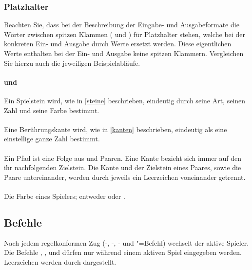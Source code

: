 \documentclass[ngerman, gray]{sdqassignment}
\begin{document}
\subsubsection{Platzhalter}
Beachten Sie, dass bei der Beschreibung der Eingabe- und Ausgabeformate die Wörter zwischen spitzen Klammen (\txt{<} und \txt{>}) für Platzhalter stehen, welche bei der konkreten Ein- und Ausgabe durch Werte ersetzt werden. Diese eigentlichen Werte enthalten bei der Ein- und Ausgabe keine spitzen Klammern. Vergleichen Sie hierzu auch die jeweiligen Beispielabläufe.

\paragraph{ und } Ein Spielstein wird, wie in \cref{steine} beschrieben, eindeutig durch seine Art, seinen Zahl und seine Farbe bestimmt.

\paragraph{} Eine Berührungskante wird, wie in \cref{kanten} beschrieben, eindeutig als eine einstellige ganze Zahl bestimmt.

\paragraph{} Ein Pfad ist eine Folge aus  und  Paaren. Eine Kante bezieht sich immer auf den ihr nachfolgenden Zielstein. Die Kante und der Zielstein eines Paares, sowie die Paare untereinander, werden durch jeweils ein Leerzeichen voneinander getrennt.

\paragraph{} Die Farbe eines Spielers; entweder  oder .

\subsection{Befehle}
Nach jedem regelkonformen Zug (-, -, - und "=Befehl) wechselt der aktive Spieler. Die Befehle , ,  und  dürfen nur während einem aktiven Spiel eingegeben werden. Leerzeichen werden durch \visiblespace dargestellt.
\end{document}
